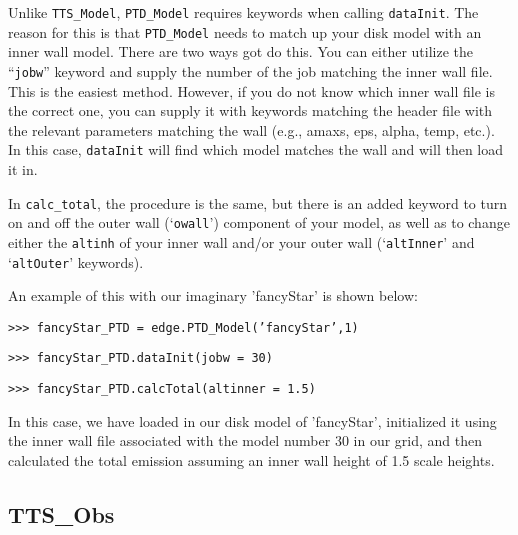 \documentclass{article}
\begin{document}
\noindent Unlike \texttt{TTS\_Model}, \texttt{PTD\_Model} requires keywords when calling \texttt{dataInit}. The reason for this is that \texttt{PTD\_Model} needs to match up your disk model with an inner wall model. There are two ways got do this. You can either utilize the “\texttt{jobw}” keyword and supply the number of the job matching the inner wall file. This is the easiest method. However, if you do not know which inner wall file is the correct one, you can supply it with keywords matching the header file with the relevant parameters matching the wall (e.g., amaxs, eps, alpha, temp, etc.). In this case, \texttt{dataInit} will find which model matches the wall and will then load it in. 
\vspace{2mm}

\noindent In \texttt{calc\_total}, the procedure is the same, but there is an added keyword to turn on and off the outer wall (‘\texttt{owall}’) component of your model, as well as to change either the \texttt{altinh} of your inner wall and/or your outer wall (‘\texttt{altInner}’ and ‘\texttt{altOuter}’ keywords). 
\vspace{2mm}

\noindent An example of this with our imaginary 'fancyStar' is shown below:

\vspace{2mm}
\texttt{>>> fancyStar\_PTD = edge.PTD\_Model('fancyStar',1)}

\texttt{>>> fancyStar\_PTD.dataInit(jobw = 30)}

\texttt{>>> fancyStar\_PTD.calcTotal(altinner = 1.5)}
\vspace{2mm}
 
\noindent In this case, we have loaded in our disk model of 'fancyStar', initialized it using the inner wall file associated with the model number 30 in our grid, and then calculated the total emission assuming an inner wall height of 1.5 scale heights. 
 
 
\subsection{TTS\_Obs}
 
\end{document}
